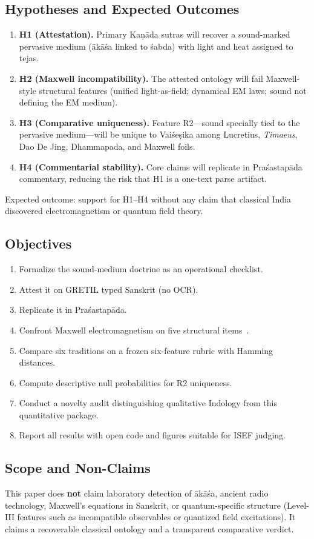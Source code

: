 \documentclass[12pt]{article}
\newcommand{\Vais}{Vaiśeṣika}
\newcommand{\Kanada}{Kaṇāda}
\newcommand{\akasa}{ākāśa}
\newcommand{\sabda}{śabda}
\newcommand{\Pras}{Praśastapāda}
\begin{document}
\subsection{Hypotheses and Expected Outcomes}
\begin{enumerate}
\item \textbf{H1 (Attestation).}
Primary \Kanada{} sutras will recover a sound-marked pervasive medium (\akasa{} linked to \sabda) with light and heat assigned to tejas.
\item \textbf{H2 (Maxwell incompatibility).}
The attested ontology will fail Maxwell-style structural features (unified light-as-field; dynamical EM laws; sound not defining the EM medium).
\item \textbf{H3 (Comparative uniqueness).}
Feature R2---sound specially tied to the pervasive medium---will be unique to \Vais{} among Lucretius, \emph{Timaeus}, Dao De Jing, Dhammapada, and Maxwell foils.
\item \textbf{H4 (Commentarial stability).}
Core claims will replicate in \Pras{} commentary, reducing the risk that H1 is a one-text parse artifact.
\end{enumerate}
Expected outcome: support for H1--H4 without any claim that classical India discovered electromagnetism or quantum field theory.

\subsection{Objectives}
\begin{enumerate}
\item Formalize the sound-medium doctrine as an operational checklist.
\item Attest it on GRETIL typed Sanskrit (no OCR).
\item Replicate it in \Pras.
\item Confront Maxwell electromagnetism on five structural items~\cite{jackson1999}.
\item Compare six traditions on a frozen six-feature rubric with Hamming distances.
\item Compute descriptive null probabilities for R2 uniqueness.
\item Conduct a novelty audit distinguishing qualitative Indology from this quantitative package.
\item Report all results with open code and figures suitable for ISEF judging.
\end{enumerate}

\subsection{Scope and Non-Claims}
This paper does \textbf{not} claim laboratory detection of \akasa{}, ancient radio technology, Maxwell's equations in Sanskrit, or quantum-specific structure (Level-III features such as incompatible observables or quantized field excitations).
It claims a recoverable classical ontology and a transparent comparative verdict.
\end{document}
